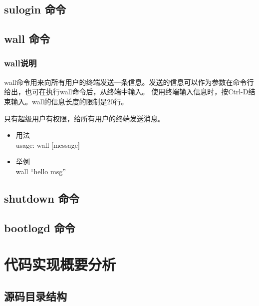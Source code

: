 \subsection{sulogin 命令}

\subsection{wall 命令}

\subsubsection{wall说明}

wall命令用来向所有用户的终端发送一条信息。发送的信息可以作为参数在命令行给出，也可在执行wall命令后，从终端中输入。
使用终端输入信息时，按Ctrl-D结束输入。wall的信息长度的限制是20行。

只有超级用户有权限，给所有用户的终端发送消息。

\begin{itemize}
\item
  用法\\ usage: wall {[}message{]}
\item
  举例\\ wall ``hello msg''
\end{itemize}
\subsection{shutdown 命令}

\subsection{bootlogd 命令}

\section{代码实现概要分析}

\subsection{源码目录结构}

